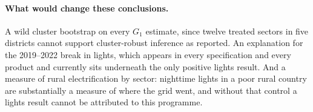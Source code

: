 \documentclass[11pt]{article}
\begin{document}
\paragraph{What would change these conclusions.} A wild cluster bootstrap on every $G_1$ estimate,
since twelve treated sectors in five districts cannot support cluster-robust inference as reported.
An explanation for the 2019--2022 break in lights, which appears in every specification and every
product and currently sits underneath the only positive lights result. And a measure of rural
electrification by sector: nighttime lights in a poor rural country are substantially a measure of
where the grid went, and without that control a lights result cannot be attributed to this programme.
\end{document}
